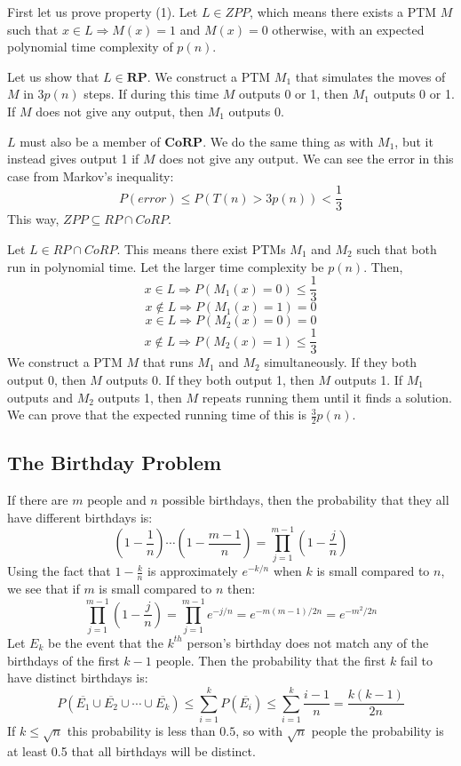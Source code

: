\documentclass[12pt,letterpaper]{article}
\theoremstyle{definition}
\begin{document}
  First let us prove property (1). Let $L \in ZPP$, which means there exists a PTM $M$ such that $x \in L \Rightarrow M(x) = 1$  and $M(x) = 0$ otherwise, with an expected polynomial time complexity of $p(n)$. 

  Let us show that $L \in \mathbf{RP}$. We construct a PTM $M_1$ that simulates the moves of $M$ in $3p(n)$ steps. If during this time $M$ outputs 0 or 1, then $M_1$ outputs 0 or 1. If $M$ does not give any output, then $M_1$ outputs 0.

  $L$ must also be a member of $\mathbf{CoRP}$. We do the same thing as with $M_1$, but it instead gives output 1 if $M$ does not give any output. We can see the error in this case from Markov's inequality:
  \[P(error) \leq P(T(n) > 3p(n)) < \frac{1}{3}\]
  This way, $ZPP \subseteq RP \cap CoRP$.

  Let $L \in RP \cap CoRP$. This means there exist PTMs $M_1$ and $M_2$ such that both run in polynomial time. Let the larger time complexity be $p(n)$. Then, 
  \[x \in L \Rightarrow P(M_1(x) = 0) \leq \frac{1}{3}\]
  \[x \notin L \Rightarrow P(M_1(x) = 1)  = 0\]
  \[x \in L \Rightarrow P(M_2(x) = 0) = 0\]
  \[x \notin L \Rightarrow P(M_2(x) = 1) \leq \frac{1}{3}\]
  We construct a PTM $M$ that runs $M_1$ and $M_2$ simultaneously. If they both output 0, then $M$ outputs 0. If they both output 1, then $M$ outputs 1. If $M_1$ outputs and $M_2$ outputs 1, then $M$ repeats running them until it finds a solution. We can prove that the expected running time of this is $\frac{3}{2}p(n)$.

\subsection{The Birthday Problem}

If there are $m$ people and $n$ possible birthdays, then the probability that they all have different birthdays is:
\[\left( 1-\frac{1}{n} \right) \cdots \left( 1 - \frac{m-1}{n} \right) = \prod_{j=1}^{m-1} \left( 1 - \frac{j}{n} \right)\]
Using the fact that $1 - \frac{k}{n}$ is approximately $e^{-k/n}$ when $k$ is small compared to $n$, we see that if $m$ is small compared to $n$ then:
\[\prod_{j=1}^{m-1} \left( 1 - \frac{j}{n} \right) = \prod_{j=1}^{m-1} e^{-j/n} = e^{-m(m-1)/2n} = e^{-m^2/2n}\]
Let $E_k$ be the event that the $k^{th}$ person's birthday does not match any of the birthdays of the first $k-1$ people. Then the probability that the first $k$ fail to have distinct birthdays is:
\[P(\overline{E_1} \cup \overline{E_2} \cup \cdots \cup \overline{E_k}) \leq \sum_{i=1}^k P(\overline{E_i}) \leq \sum_{i=1}^k \frac{i-1}{n} = \frac{k(k-1)}{2n}\]
If $k \leq \sqrt{n}$ this probability is less than $0.5$, so with $\sqrt{n}$ people the probability is at least 0.5 that all birthdays will be distinct.
\end{document}
